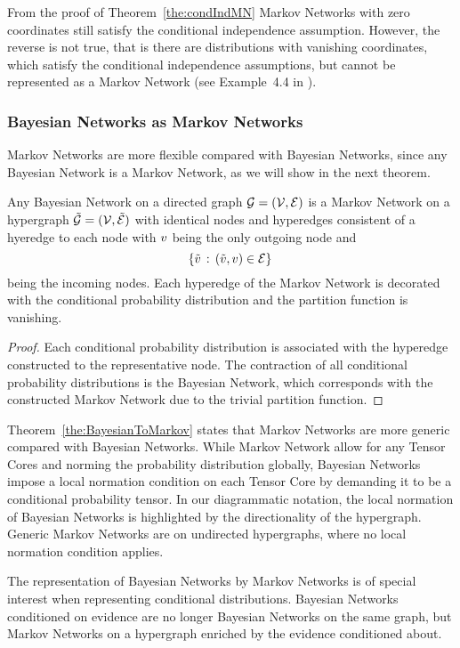 From the proof of Theorem~\ref{the:condIndMN} Markov Networks with zero coordinates still satisfy the conditional independence assumption.
However, the reverse is not true, that is there are distributions with vanishing coordinates, which satisfy the conditional independence assumptions, but cannot be represented as a Markov Network (see Example~4.4 in \cite{koller_probabilistic_2009}).

\subsubsection{Bayesian Networks as Markov Networks}

Markov Networks are more flexible compared with Bayesian Networks, since any Bayesian Network is a Markov Network, as we will show in the next theorem.

\begin{theorem}\label{the:BayesianToMarkov}
	Any Bayesian Network on a directed graph $\mathcal{G}=(\mathcal{V},\mathcal{E})$ is a Markov Network on a hypergraph $\tilde{\mathcal{G}}=(\mathcal{V},\tilde{\mathcal{E}})$ with identical nodes and hyperedges consistent of  a hyeredge to each node with $v$ being the only outgoing node and
		\[  \{\tilde{v} \, : \, (\tilde{v},v) \in \mathcal{E}\} \,  \]
	being the incoming nodes.
	Each hyperedge of the Markov Network is decorated with the conditional probability distribution and the partition function is vanishing.
\end{theorem}
\begin{proof}
	Each conditional probability distribution is associated with the hyperedge constructed to the representative node.
	The contraction of all conditional probability distributions is the Bayesian Network, which corresponds with the constructed Markov Network due to the trivial partition function.
\end{proof}

Theorem~\ref{the:BayesianToMarkov} states that Markov Networks are more generic compared with Bayesian Networks.
While Markov Network allow for any Tensor Cores and norming the probability distribution globally, Bayesian Networks impose a local normation condition on each Tensor Core by demanding it to be a conditional probability tensor.
In our diagrammatic notation, the local normation of Bayesian Networks is highlighted by the directionality of the hypergraph.
Generic Markov Networks are on undirected hypergraphs, where no local normation condition applies.

The representation of Bayesian Networks by Markov Networks is of special interest when representing conditional distributions.
Bayesian Networks conditioned on evidence are no longer Bayesian Networks on the same graph, but Markov Networks on a hypergraph enriched by the evidence conditioned about.








